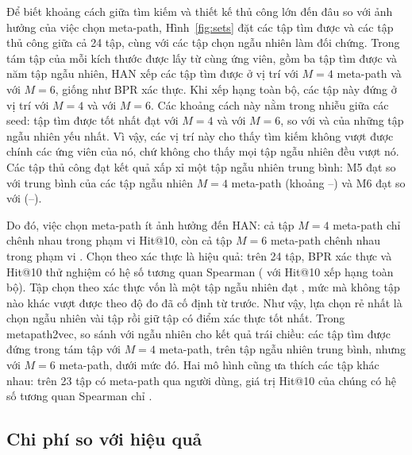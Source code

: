 Để biết khoảng cách giữa tìm kiếm và thiết kế thủ công lớn đến đâu so với ảnh hưởng của việc chọn
meta-path, Hình~\ref{fig:sets} đặt các tập tìm được và các tập thủ công giữa cả 24 tập, cùng với các tập
chọn ngẫu nhiên làm đối chứng. Trong tám tập của mỗi kích thước được lấy
từ cùng  ứng viên, gồm ba tập tìm được và năm tập ngẫu nhiên, HAN xếp các tập
tìm được ở vị trí  với $M = 4$ meta-path và  với $M = 6$, giống như
BPR xác thực. Khi xếp hạng toàn bộ, các tập này đứng ở vị trí  với $M = 4$ và
 với $M = 6$. Các khoảng cách này nằm trong nhiễu giữa các seed: tập tìm được tốt
nhất đạt  với $M = 4$ và  với $M = 6$, so với
 và  của những tập ngẫu nhiên yếu nhất. Vì vậy, các vị trí này cho
thấy tìm kiếm không vượt được chính các ứng viên của nó, chứ không cho thấy mọi tập ngẫu nhiên đều vượt nó.
Các tập thủ công đạt kết quả xấp xỉ một tập ngẫu nhiên trung bình: M5 đạt  so với
trung bình  của các tập ngẫu nhiên $M = 4$ meta-path (khoảng
--) và M6 đạt  so với
 (--).



Do đó, việc chọn meta-path ít ảnh hưởng đến HAN: cả  tập $M = 4$ meta-path chỉ chênh
nhau trong phạm vi  Hit@10, còn cả  tập $M = 6$ meta-path chênh nhau trong phạm vi
. Chọn theo xác thực là hiệu quả: trên 24 tập, BPR xác thực và Hit@10 thử nghiệm có
hệ số tương quan Spearman  ( với Hit@10 xếp hạng toàn
bộ). Tập chọn theo xác thực vốn là một tập ngẫu nhiên đạt , mức mà không tập
nào khác vượt được theo độ đo đã cố định từ trước. Như vậy, lựa chọn rẻ nhất là chọn ngẫu nhiên vài tập
rồi giữ tập có điểm xác thực tốt nhất. Trong metapath2vec, so sánh với ngẫu nhiên cho kết quả trái
chiều: các tập tìm được đứng  trong tám tập với $M = 4$ meta-path, trên tập ngẫu nhiên
trung bình, nhưng  với $M = 6$ meta-path, dưới mức đó. Hai mô hình cũng ưa thích các
tập khác nhau: trên 23 tập có meta-path qua người dùng, giá trị Hit@10 của chúng có hệ số tương
quan Spearman chỉ .

\subsection{Chi phí so với hiệu quả}
\label{sec:res-cost}

